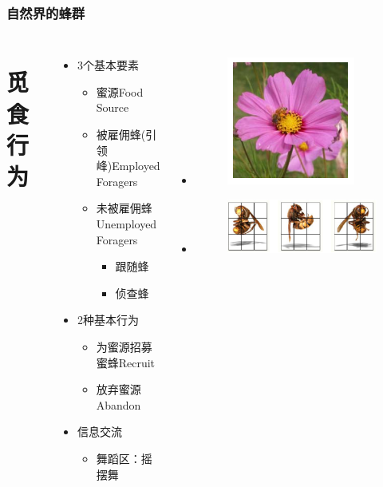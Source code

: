 \begin{frame}
	\frametitle{自然界的蜂群}
	\begin{columns}
		\section{觅食行为}
		\begin{itemize}
			\item { 3个基本要素}
				\begin{itemize}
					\item { 蜜源Food Source}
					\item { 被雇佣蜂(引领峰)Employed Foragers}
					\item { 未被雇佣蜂Unemployed Foragers}
						\begin{itemize}
							\item { 跟随蜂 }
							\item { 侦查蜂 }
						\end{itemize}
				\end{itemize}
			\item { 2种基本行为}
				\begin{itemize}
					\item {为蜜源招募蜜蜂Recruit}
					\item {放弃蜜源Abandon}
				\end{itemize}
			 \item { 信息交流}
				\begin{itemize}
					\item {舞蹈区：摇摆舞}
				\end{itemize}
		\end{itemize}
		\begin{itemize}
			\item[ ] 
				\begin{figure}[htbp]
					\centering
					\includegraphics[scale=0.5]{pic/bee1.png}
				\end{figure}
			\item[ ]
				\begin{figure}[htbp]
					\centering
					\includegraphics[scale=0.5]{pic/bee2.png}

\end{figure}
\end{itemize}
\end{columns}
\end{frame}
